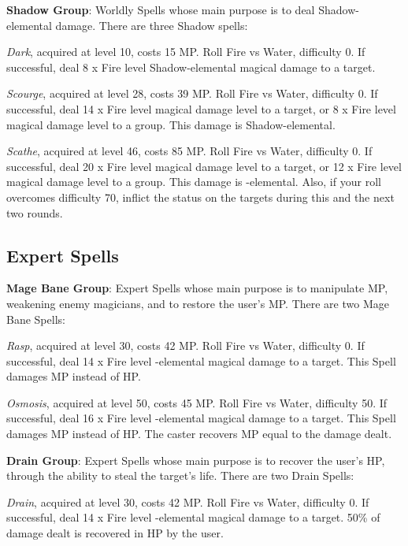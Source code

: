 \begin{multicols}{2}
    \textbf{Shadow Group}: Worldly Spells whose main purpose is to deal Shadow-elemental damage. There are three Shadow spells:
    
    \textit{Dark}, acquired at level 10, costs 15 MP. Roll Fire vs Water, difficulty 0. If successful, deal 8 x Fire level {Shadow}-elemental magical damage to a target.
    
    \textit{Scourge}, acquired at level 28, costs 39 MP. Roll Fire vs Water, difficulty 0. If successful, deal 14 x Fire level magical damage level to a target, or 8 x Fire level magical damage level to a group. This damage is {Shadow}-elemental.
    
    \textit{Scathe}, acquired at level 46, costs 85 MP. Roll Fire vs Water, difficulty 0. If successful, deal 20 x Fire level magical damage level to a target, or 12 x Fire level magical damage level to a group. This damage is -elemental. Also, if your roll overcomes difficulty 70, inflict the  status on the targets during this and the next two rounds.
    
    \subsection{Expert Spells}

    \textbf{Mage Bane Group}: Expert Spells whose main purpose is to manipulate MP, weakening enemy magicians, and to restore the user's MP. There are two Mage Bane Spells:
    
    \textit{Rasp}, acquired at level 30, costs 42 MP. Roll Fire vs Water, difficulty 0. If successful, deal 14 x Fire level -elemental magical damage to a target. This Spell damages MP instead of HP.
    
    \textit{Osmosis}, acquired at level 50, costs 45 MP. Roll Fire vs Water, difficulty 50. If successful, deal 16 x Fire level -elemental magical damage to a target. This Spell damages MP instead of HP. The caster recovers MP equal to the damage dealt.
    
    \textbf{Drain Group}: Expert Spells whose main purpose is to recover the user's HP, through the ability to steal the target’s life. There are two Drain Spells:
    
    \textit{Drain}, acquired at level 30, costs 42 MP. Roll Fire vs Water, difficulty 0. If successful, deal 14 x Fire level -elemental magical damage to a target. 50\% of damage dealt is recovered in HP by the user.
    

\end{multicols}
